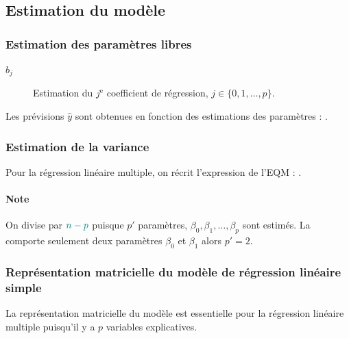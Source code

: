\documentclass[french]{article}
\begin{document}
\begin{multicols*}{2}
\subsection{Estimation du modèle}
\subsubsection{Estimation des paramètres libres}
\begin{distributions}[Notation]
\begin{description}
	\item[$b_{j}$]	Estimation du $j^{\text{e}}$ coefficient de régression, $j \in \{0, 1, \dots, p\}$.
\end{description}
\end{distributions}

\begin{definitionNOHFILL}
Les prévisions $\hat{y}$ sont obtenues en fonction des estimations des paramètres : . 
\end{definitionNOHFILL}


\subsubsection{Estimation de la variance}
Pour la régression linéaire multiple, on récrit l'expression de l'EQM : . 
	
\paragraph{Note}	On divise par $\textcolor{teal}{n - p}$ puisque $p'$ paramètres, $\beta_{0}, \beta_{1}, \dots, \beta_{p}$ sont estimés. La \textit{\underline{}} comporte seulement deux paramètres $\beta_{0}$ et $\beta_{1}$ alors $p' = 2$.



\subsubsection{Représentation matricielle du modèle de régression linéaire simple}
\begin{rappel_enhanced}[Contexte]
La représentation matricielle du modèle est essentielle pour la régression linéaire multiple puisqu'il y a $p$ variables explicatives. 
\end{rappel_enhanced}



\end{multicols*}
\end{document}
